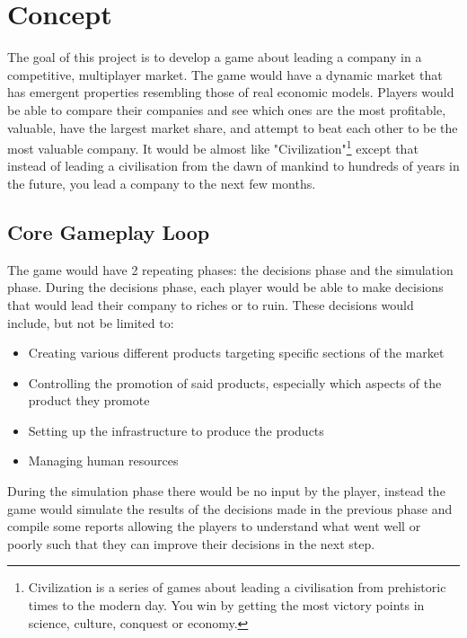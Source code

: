 \section{Concept}

The goal of this project is to develop a game about leading a company in a competitive, multiplayer market. The game
would have a dynamic market that has emergent properties resembling those of real economic models. Players would be able
to compare their companies and see which ones are the most profitable, valuable, have the largest market share, and
attempt to beat each other to be the most valuable company. It would be almost like "Civilization"\footnote{Civilization is
	a series of games about leading a civilisation from prehistoric times to the modern day. You win by getting the most victory
	points in science, culture, conquest or economy.} except that instead
of leading a civilisation from the dawn of mankind to hundreds of years in the future, you lead a company to the next few months.

\subsection*{Core Gameplay Loop}

The game would have 2 repeating phases: the decisions phase and the simulation phase. During the decisions phase, each
player would be able to make decisions that would lead their company to riches or to ruin. These decisions would
include, but not be limited to:
\begin{itemize}
	\item Creating various different products targeting specific sections of the market
	\item Controlling the promotion of said products, especially which aspects of the product they promote
	\item Setting up the infrastructure to produce the products
	\item Managing human resources
\end{itemize}

During the simulation phase there would be no input by the player, instead the game would simulate the results of the
decisions made in the previous phase and compile some reports allowing the players to understand what went well or
poorly such that they can improve their decisions in the next step.
